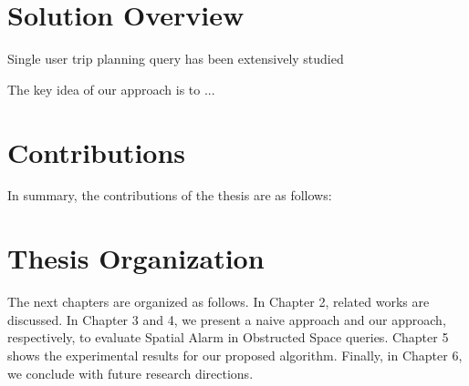 \section{Solution Overview}
\vspace*{6pt}

Single user trip planning query has been extensively studied~
\vspace*{5pt}

The key idea of our approach is to ...
\vspace*{12pt}




\section{Contributions}


In summary, the contributions of the thesis are as follows:


\vspace*{8pt}


\section{Thesis Organization}
\label{sec:org}

\vspace*{5pt}

The next chapters are organized as follows. In Chapter 2, related works are discussed. In Chapter 3 and 4, we present a naive approach and our approach, respectively, to evaluate Spatial Alarm in Obstructed Space queries. Chapter 5 shows the experimental results for our proposed algorithm. Finally, in Chapter 6, we conclude with future research directions.


